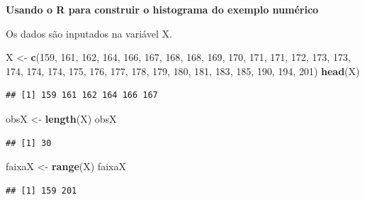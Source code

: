 \documentclass[
]{book}
\newenvironment{Shaded}{\begin{snugshade}}{\end{snugshade}}
\newcommand{\DecValTok}[1]{\textcolor[rgb]{0.00,0.00,0.81}{#1}}
\newcommand{\KeywordTok}[1]{\textcolor[rgb]{0.13,0.29,0.53}{\textbf{#1}}}
\newcommand{\NormalTok}[1]{#1}
\newcommand{\StringTok}[1]{\textcolor[rgb]{0.31,0.60,0.02}{#1}}
\begin{document}
\textbf{Usando o R para construir o histograma do exemplo numérico}

Os dados são inputados na variável X.

\begin{Shaded}
\begin{Highlighting}[]
\NormalTok{X <-}\StringTok{ }\KeywordTok{c}\NormalTok{(}\DecValTok{159}\NormalTok{, }\DecValTok{161}\NormalTok{, }\DecValTok{162}\NormalTok{, }\DecValTok{164}\NormalTok{, }\DecValTok{166}\NormalTok{, }\DecValTok{167}\NormalTok{, }\DecValTok{168}\NormalTok{, }\DecValTok{168}\NormalTok{, }\DecValTok{169}\NormalTok{, }
    \DecValTok{170}\NormalTok{, }\DecValTok{171}\NormalTok{, }\DecValTok{171}\NormalTok{, }\DecValTok{172}\NormalTok{, }\DecValTok{173}\NormalTok{, }\DecValTok{173}\NormalTok{, }\DecValTok{174}\NormalTok{, }\DecValTok{174}\NormalTok{, }\DecValTok{174}\NormalTok{, }\DecValTok{175}\NormalTok{, }
    \DecValTok{176}\NormalTok{, }\DecValTok{177}\NormalTok{, }\DecValTok{178}\NormalTok{, }\DecValTok{179}\NormalTok{, }\DecValTok{180}\NormalTok{, }\DecValTok{181}\NormalTok{, }\DecValTok{183}\NormalTok{, }\DecValTok{185}\NormalTok{, }\DecValTok{190}\NormalTok{, }\DecValTok{194}\NormalTok{, }
    \DecValTok{201}\NormalTok{)}
\KeywordTok{head}\NormalTok{(X)}
\end{Highlighting}
\end{Shaded}

\begin{verbatim}
## [1] 159 161 162 164 166 167
\end{verbatim}

\begin{Shaded}
\begin{Highlighting}[]
\NormalTok{obsX <-}\StringTok{ }\KeywordTok{length}\NormalTok{(X)}
\NormalTok{obsX}
\end{Highlighting}
\end{Shaded}

\begin{verbatim}
## [1] 30
\end{verbatim}

\begin{Shaded}
\begin{Highlighting}[]
\NormalTok{faixaX <-}\StringTok{ }\KeywordTok{range}\NormalTok{(X)}
\NormalTok{faixaX}
\end{Highlighting}
\end{Shaded}

\begin{verbatim}
## [1] 159 201
\end{verbatim}
\end{document}
